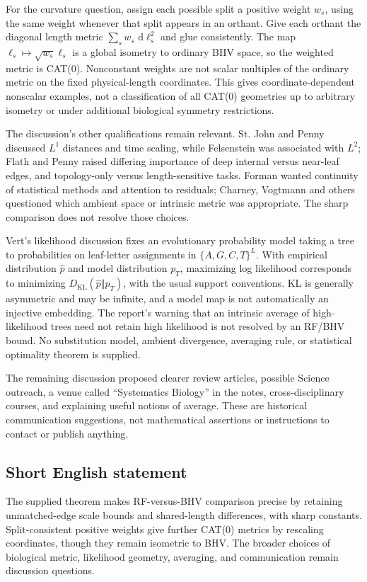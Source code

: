 \documentclass[11pt]{article}
\newcommand{\dd}{\,\mathrm{d}}
\begin{document}
For the curvature question, assign each possible split a positive weight \(w_s\), using the same weight whenever that split appears in an orthant. Give each orthant the diagonal length metric \(\sum_s w_s\,\dd\ell_s^2\) and glue consistently. The map \(\ell_s\mapsto\sqrt{w_s}\ell_s\) is a global isometry to ordinary BHV space, so the weighted metric is CAT(0). Nonconstant weights are not scalar multiples of the ordinary metric on the fixed physical-length coordinates. This gives coordinate-dependent nonscalar examples, not a classification of all CAT(0) geometries up to arbitrary isometry or under additional biological symmetry restrictions.

The discussion's other qualifications remain relevant. St. John and Penny discussed \(L^1\) distances and time scaling, while Felsenstein was associated with \(L^2\); Flath and Penny raised differing importance of deep internal versus near-leaf edges, and topology-only versus length-sensitive tasks. Forman wanted continuity of statistical methods and attention to residuals; Charney, Vogtmann and others questioned which ambient space or intrinsic metric was appropriate. The sharp comparison does not resolve those choices.

Vert's likelihood discussion fixes an evolutionary probability model taking a tree to probabilities on leaf-letter assignments in \(\{A,G,C,T\}^{L}\). With empirical distribution \(\widehat p\) and model distribution \(p_T\), maximizing log likelihood corresponds to minimizing \(D_{\mathrm{KL}}(\widehat p\Vert p_T)\), with the usual support conventions. KL is generally asymmetric and may be infinite, and a model map is not automatically an injective embedding. The report's warning that an intrinsic average of high-likelihood trees need not retain high likelihood is not resolved by an RF/BHV bound. No substitution model, ambient divergence, averaging rule, or statistical optimality theorem is supplied.

The remaining discussion proposed clearer review articles, possible Science outreach, a venue called ``Systematics Biology'' in the notes, cross-disciplinary courses, and explaining useful notions of average. These are historical communication suggestions, not mathematical assertions or instructions to contact or publish anything.
\subsection{Short English statement}
The supplied theorem makes RF-versus-BHV comparison precise by retaining unmatched-edge scale bounds and shared-length differences, with sharp constants. Split-consistent positive weights give further CAT(0) metrics by rescaling coordinates, though they remain isometric to BHV. The broader choices of biological metric, likelihood geometry, averaging, and communication remain discussion questions.
\end{document}
